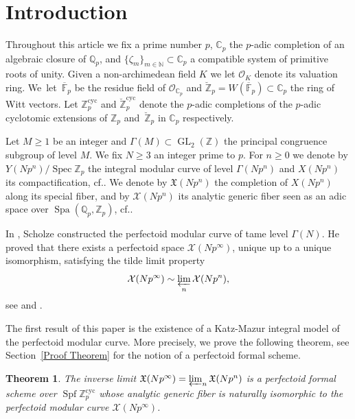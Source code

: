\documentclass[11pt]{article}
\newcommand{\cf}{cf.\xspace}
\newcommand{\cyc}{\mathrm{cyc}}
\numberwithin{equation}{section}
\newtheorem{theo}[prop]{Theorem}
\theoremstyle{definition}
\newcommand{\bb}[1]{\mathbb{#1}}
\newcommand{\n}[1]{\mathcal{#1}}
\newcommand{\f}[1]{\mathfrak{#1}}
\DeclareMathOperator{\GL}{GL}
\DeclareMathOperator{\Spf}{Spf}
\DeclareMathOperator{\Spec}{Spec}
\DeclareMathOperator{\Spa}{Spa}
\begin{document}
\section*{Introduction}
Throughout this article we fix a prime number $p$, $\bb{C}_p$ the $p$-adic completion of an algebraic closure of $\bb{Q}_p$, and $\{\zeta_{m}\}_{m\in \bb{N}}\subset \bb{C}_p$ a compatible system of primitive roots of unity. Given a non-archimedean field $K$ we let $\n{O}_K$ denote its valuation ring. We~let~$\overline{\bb{F}}_p$ be the residue field of $\n{O}_{\bb{C}_p}$ and $\breve{\bb{Z}}_p=W(\overline{\bb{F}}_p)\subset \bb{C}_p$ the ring of Witt vectors. Let $\bb{Z}_p^{\cyc}$ and $\breve{\bb{Z}}_p^{\cyc}$ denote the $p$-adic completions of the $p$-adic cyclotomic extensions of $\bb{Z}_p$ and~$\breve{\bb{Z}}_p$ in $\bb{C}_p$ respectively.

Let $M\geq 1$ be an integer and $\Gamma(M)\subset \GL_2(\bb{Z})$ the principal congruence subgroup of level $M$. We fix $N\geq 3$ an integer prime to $p$. For $n\geq 0$ we denote by $Y(Np^n)/ \Spec \bb{Z}_p$ the integral modular curve of level $\Gamma(Np^n)$ and $X(Np^n)$ its compactification, \cf \cite{katz1985arithmetic}. We denote by $\f{X}(Np^n)$ the completion of $X(Np^n)$ along its special fiber, and by $\n{X}(Np^n)$ its analytic generic fiber seen as an adic space over $\Spa(\bb{Q}_p, \bb{Z}_p)$, \cf \cite{MR1734903}.

In \cite{scholzeTorsCoho2015}, Scholze constructed the perfectoid modular curve of tame level $\Gamma(N)$. He proved that there exists a perfectoid space $\n{X}(Np^\infty)$, unique up to a unique isomorphism, satisfying the tilde limit property
\[
\n{X}(Np^\infty)\sim \varprojlim_n \n{X}(Np^n),
\]
see \cite[Def.\,2.4.1]{scholze2013moduli} and \cite[Def.\,2.4.2]{MR1734903}.

The first result of this paper is the existence of a Katz-Mazur integral model of the perfectoid modular curve. More precisely, we prove the following theorem, see Section~\ref{Proof Theorem} for the notion of a perfectoid formal scheme.

\begin{theo}
\label{Theo1Intro}
The inverse limit $\f{X}(Np^\infty)= \varprojlim_n \f{X}(Np^n)$ is a perfectoid formal scheme over $\Spf \bb{Z}_p^{\cyc}$ whose analytic generic fiber is naturally isomorphic to the perfectoid modular curve $\n{X}(Np^\infty)$.
\end{theo}
\end{document}
